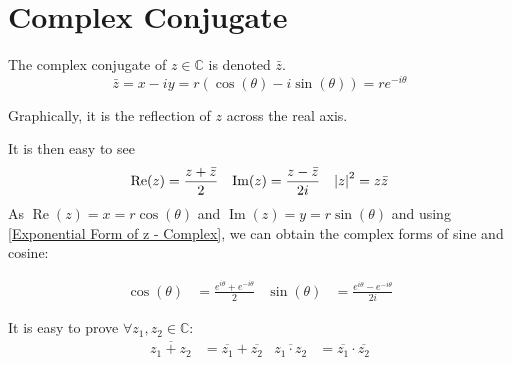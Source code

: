 \documentclass[12pt, english]{book}
\begin{document}
	
	\section{Complex Conjugate} \label{Complex Conjugate Section - Complex}
	\begin{definition}
		The complex conjugate of $z \in \mathbb{C}$ is denoted $\bar{z}$.
		$$\bar{z} = x - iy = r(\cos(\theta) - i\sin(\theta)) = re^{-i\theta}$$
		\label{Complex Conjugate}
	\end{definition}
	Graphically, it is the reflection of $z$ across the real axis.
	\begin{center}
	\end{center}
	It is then easy to see
	\begin{align*}
		\operatorname{Re}(z) &= \frac{z + \bar{z}}{2} & \operatorname{Im}(z) &= \frac{z - \bar{z}}{2i} & \abs{z}^2 = z \bar{z}
	\end{align*}
	As $\operatorname{Re}(z) = x = r \cos(\theta)$ and $\operatorname{Im}(z) = y = r \sin(\theta)$ and using \cref{Exponential Form of z - Complex}, we can obtain the complex forms of sine and cosine: 
	\begin{definition}
		\begin{align*}
			\cos(\theta) &= \frac{e^{i \theta} + e^{-i \theta}}{2} 
			&\sin(\theta) &= \frac{e^{i \theta} - e^{-i \theta}}{2i}
		\end{align*}
		\label{Trig Identities - Complex}
	\end{definition}
	It is easy to prove \(\forall z_1, z_2 \in \mathbb{C}\): 
	\begin{align*}
		\overline{z_1 + z_2} &= \overline{z_1} + \overline{z_2} &
		\overline{z_1 \cdot z_2} &= \overline{z_1} \cdot \overline{z_2}
	\end{align*}
\end{document}
